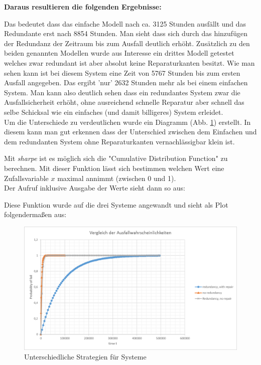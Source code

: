 \documentclass[10pt,a4paper]{article}
\begin{document}
\textbf{Daraus resultieren die folgenden Ergebnisse:} 

Das bedeutet dass das einfache Modell nach ca. 3125 Stunden ausfällt und das Redundante erst nach 8854 Stunden. Man sieht dass sich durch das hinzufügen der Redundanz der Zeitraum bis zum Ausfall deutlich erhöht.
Zusätzlich zu den beiden genannten Modellen wurde aus Interesse ein drittes Modell getestet welches
zwar redundant ist aber absolut keine Reparaturkanten besitzt. Wie man sehen kann ist bei diesem System eine Zeit von 5767 Stunden bis zum ersten Ausfall angegeben. 
Das ergibt 'nur' 2632 Stunden mehr als bei einem einfachen System. Man kann also deutlich sehen dass ein redundantes System zwar die Ausfallsicherheit erhöht, ohne ausreichend schnelle Reparatur aber
schnell das selbe Schicksal wie ein einfaches (und damit billigeres) System erleidet.
\\
Um die Unterschiede zu verdeutlichen wurde ein Diagramm (Abb. \ref{fail_plot}) erstellt. In diesem kann man gut erkennen dass der Unterschied zwischen dem Einfachen und dem redundanten System ohne Reparaturkanten vernachlässigbar klein ist.

Mit \textit{sharpe} ist es möglich sich die "Cumulative Distribution Function" zu berechnen.
Mit dieser Funktion lässt sich bestimmen welchen Wert eine Zufallsvariable $x$ maximal annimmt (zwischen 0 und 1). \\
Der Aufruf inklusive Ausgabe der Werte sieht dann so aus:

Diese Funktion wurde auf die drei Systeme angewandt und sieht als Plot folgendermaßen aus:

\begin{figure}[ht!]
\centering
\includegraphics[width=140mm]{Ausfallwahrscheinlichkeit_Plot.png}
\caption{Unterschiedliche Strategien für Systeme \label{fail_plot}}
\end{figure}
\end{document}
